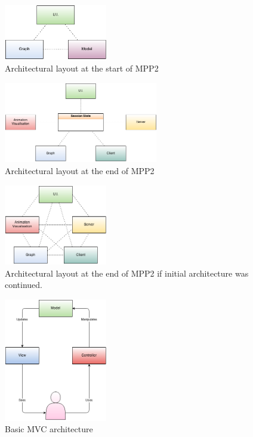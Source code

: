 \begin{figure}[h!]
    \centering
    \includegraphics[width=0.4\textwidth]{images/initial_architecture.png}
    \caption{Architectural layout at the start of MPP2}
    \label{fig:initial_architecture}
\end{figure}

\begin{figure}[h!]
    \centering
    \includegraphics[width=0.6\textwidth]{images/final_architecture.png}
    \caption{Architectural layout at the end of MPP2}
    \label{fig:final_architecture}
\end{figure}

\begin{figure}[h!]
    \centering
    \includegraphics[width=0.4\textwidth]{images/initial_architecture_future.png}
    \caption{Architectural layout at the end of MPP2 if initial architecture was continued.}
    \label{fig:initial_architecture_future}
\end{figure}


\begin{figure}[h!]
    \centering
    \includegraphics[width=0.4\textwidth]{images/mvc.png}
    \caption{Basic \ac{MVC} architecture}
    \label{fig:mvc}
\end{figure}

